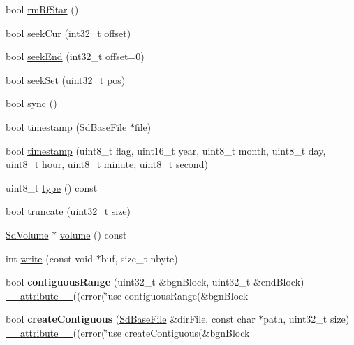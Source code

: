 \begin{DoxyCompactItemize}
\item 
bool \hyperlink{class_sd_base_file_a5cbe5f8201b8457438d219e6b33b42bf}{rm\-Rf\-Star} ()
\item 
bool \hyperlink{class_sd_base_file_ae79988724675a378d01d9158b1b8b667}{seek\-Cur} (int32\-\_\-t offset)
\item 
bool \hyperlink{class_sd_base_file_ae7667637428e752e4ff64e07c2e88c92}{seek\-End} (int32\-\_\-t offset=0)
\item 
bool \hyperlink{class_sd_base_file_a37e6f66b2ccbd829cf7a62a5d3bcc0b3}{seek\-Set} (uint32\-\_\-t pos)
\item 
bool \hyperlink{class_sd_base_file_a3eb7f41182c04388c951db242c13f845}{sync} ()
\item 
bool \hyperlink{class_sd_base_file_a65d54c8f0cc5089edbd0b08eb3e7830e}{timestamp} (\hyperlink{class_sd_base_file}{Sd\-Base\-File} $\ast$file)
\item 
bool \hyperlink{class_sd_base_file_a679c37021bcac29a8a47cdb0b014ae4d}{timestamp} (uint8\-\_\-t flag, uint16\-\_\-t year, uint8\-\_\-t month, uint8\-\_\-t day, uint8\-\_\-t hour, uint8\-\_\-t minute, uint8\-\_\-t second)
\item 
uint8\-\_\-t \hyperlink{class_sd_base_file_a7c3e8c8aa22970484617493a084000b9}{type} () const 
\item 
bool \hyperlink{class_sd_base_file_aa0f431cd6c841a1a006aee221a8e411d}{truncate} (uint32\-\_\-t size)
\item 
\hyperlink{class_sd_volume}{Sd\-Volume} $\ast$ \hyperlink{class_sd_base_file_aed2457152a60a9f78da3c34813e396d0}{volume} () const 
\item 
int \hyperlink{class_sd_base_file_aaf4f4cafe922e54d7b10c1b18bf60d07}{write} (const void $\ast$buf, size\-\_\-t nbyte)
\item 
\hypertarget{class_sd_base_file_a831f884ee269ed01d900f700d4999b37}{bool {\bfseries contiguous\-Range} (uint32\-\_\-t \&bgn\-Block, uint32\-\_\-t \&end\-Block) \hyperlink{group__digital_pin_ga5589cd85aa7f8bf2b29ba1541eeb7103}{\-\_\-\-\_\-attribute\-\_\-\-\_\-}((error(\char`\"{}use contiguous\-Range(\&bgn\-Block}\label{class_sd_base_file_a831f884ee269ed01d900f700d4999b37}

\item 
\hypertarget{class_sd_base_file_a24b797b735d0a69291c28c35e1d1be90}{bool {\bfseries create\-Contiguous} (\hyperlink{class_sd_base_file}{Sd\-Base\-File} \&dir\-File, const char $\ast$path, uint32\-\_\-t size) \hyperlink{group__digital_pin_ga5589cd85aa7f8bf2b29ba1541eeb7103}{\-\_\-\-\_\-attribute\-\_\-\-\_\-}((error(\char`\"{}use create\-Contiguous(\&bgn\-Block}\label{class_sd_base_file_a24b797b735d0a69291c28c35e1d1be90}


\end{DoxyCompactItemize}
